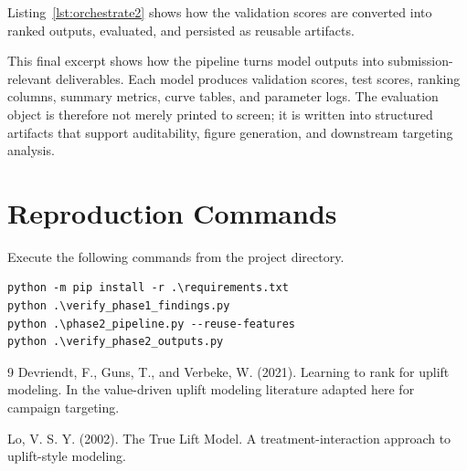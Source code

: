 \documentclass[11pt,a4paper]{article}
\begin{document}
Listing~\ref{lst:orchestrate2} shows how the validation scores are converted into ranked outputs, evaluated, and persisted as reusable artifacts.



This final excerpt shows how the pipeline turns model outputs into submission-relevant deliverables. Each model produces validation scores, test scores, ranking columns, summary metrics, curve tables, and parameter logs. The evaluation object is therefore not merely printed to screen; it is written into structured artifacts that support auditability, figure generation, and downstream targeting analysis.

\section{Reproduction Commands}
\noindent Execute the following commands from the project directory.

\begin{lstlisting}[style=pythonstyle,caption={Commands used to reproduce the work}]
python -m pip install -r .\requirements.txt
python .\verify_phase1_findings.py
python .\phase2_pipeline.py --reuse-features
python .\verify_phase2_outputs.py
\end{lstlisting}

\begin{thebibliography}{9}
Devriendt, F., Guns, T., and Verbeke, W. (2021).
\newblock Learning to rank for uplift modeling.
\newblock In the value-driven uplift modeling literature adapted here for campaign targeting.

Lo, V. S. Y. (2002).
\newblock The True Lift Model.
\newblock A treatment-interaction approach to uplift-style modeling.
\end{thebibliography}
\end{document}
